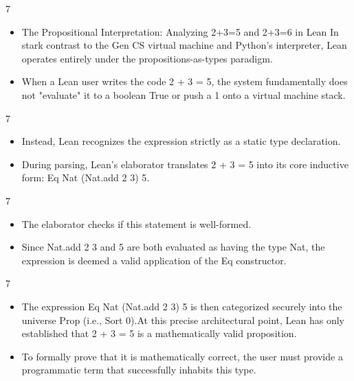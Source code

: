 \documentclass[10pt]{beamer}
\begin{document}
\begin{frame}{7}
\begin{itemize}\setlength{\itemsep}{1.5em}
  \item The Propositional Interpretation: Analyzing 2+3=5 and 2+3=6 in Lean In stark contrast to the Gen CS virtual machine and Python's interpreter, Lean operates entirely under the propositions-as-types paradigm.
  \item When a Lean user writes the code 2 + 3 = 5, the system fundamentally does not "evaluate" it to a boolean True or push a 1 onto a virtual machine stack.
\end{itemize}
\end{frame}

\begin{frame}{7}
\begin{itemize}\setlength{\itemsep}{1.5em}
  \item Instead, Lean recognizes the expression strictly as a static type declaration.
  \item During parsing, Lean's elaborator translates 2 + 3 = 5 into its core inductive form: Eq Nat (Nat.add 2 3) 5.
\end{itemize}
\end{frame}

\begin{frame}{7}
\begin{itemize}\setlength{\itemsep}{1.5em}
  \item The elaborator checks if this statement is well-formed.
  \item Since Nat.add 2 3 and 5 are both evaluated as having the type Nat, the expression is deemed a valid application of the Eq constructor.
\end{itemize}
\end{frame}

\begin{frame}{7}
\begin{itemize}\setlength{\itemsep}{1.5em}
  \item The expression Eq Nat (Nat.add 2 3) 5 is then categorized securely into the universe Prop (i.e., Sort 0).At this precise architectural point, Lean has only established that 2 + 3 = 5 is a mathematically valid proposition.
  \item To formally prove that it is mathematically correct, the user must provide a programmatic term that successfully inhabits this type.
\end{itemize}
\end{frame}
\end{document}
